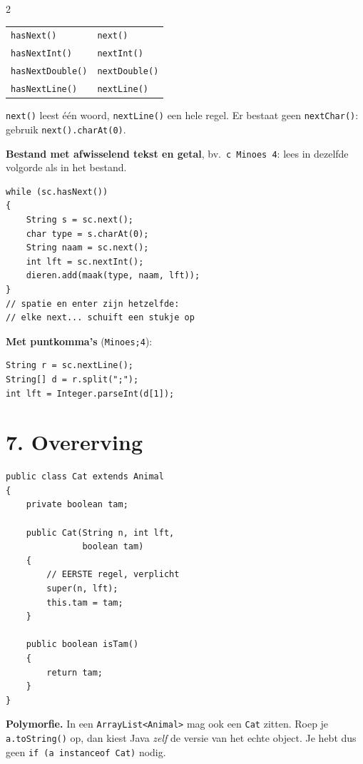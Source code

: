 \documentclass[12pt,a4paper]{extarticle}
\begin{document}
\begin{multicols}{2}
    \begin{center}
        \small
        \begin{tabular}{@{}ll@{}}
            \toprule
            \texttt{hasNext()}       & \texttt{next()}       \\
            \texttt{hasNextInt()}    & \texttt{nextInt()}    \\
            \texttt{hasNextDouble()} & \texttt{nextDouble()} \\
            \texttt{hasNextLine()}   & \texttt{nextLine()}   \\
            \bottomrule
        \end{tabular}
    \end{center}
    \texttt{next()} leest \'e\'en woord, \texttt{nextLine()} een hele regel. Er
    bestaat geen \texttt{nextChar()}: gebruik \texttt{next().charAt(0)}.

    \textbf{Bestand met afwisselend tekst en getal}, bv.\ \texttt{c Minoes 4}: lees
    in dezelfde volgorde als in het bestand.
    \begin{lstlisting}
while (sc.hasNext())
{
    String s = sc.next();
    char type = s.charAt(0);
    String naam = sc.next();
    int lft = sc.nextInt();
    dieren.add(maak(type, naam, lft));
}
// spatie en enter zijn hetzelfde:
// elke next... schuift een stukje op
\end{lstlisting}

    \textbf{Met puntkomma's} (\texttt{Minoes;4}):
    \begin{lstlisting}
String r = sc.nextLine();
String[] d = r.split(";");
int lft = Integer.parseInt(d[1]);
\end{lstlisting}

    \section{7. Overerving}
    \begin{lstlisting}
public class Cat extends Animal
{
    private boolean tam;

    public Cat(String n, int lft,
               boolean tam)
    {
        // EERSTE regel, verplicht
        super(n, lft);
        this.tam = tam;
    }

    public boolean isTam()
    {
        return tam;
    }
}
\end{lstlisting}

    \textbf{Polymorfie.} In een \texttt{ArrayList<Animal>} mag ook een \texttt{Cat}
    zitten. Roep je \texttt{a.toString()} op, dan kiest Java \emph{zelf} de versie van
    het echte object. Je hebt dus geen \texttt{if (a instanceof Cat)} nodig.


\end{multicols}
\end{document}
